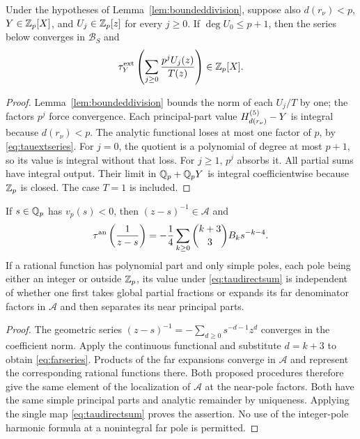 \begin{proposition}
\label{prop:integralextension}
Under the hypotheses of Lemma~\ref{lem:boundeddivision}, suppose also
$d(r_\nu)<p$, $Y\in\mathbb Z_p[X]$, and $U_j\in\mathbb Z_p[z]$ for every $j\ge0$.
If $\deg U_0\le p+1$, then the series below converges in $\mathcal B_S$ and
\begin{equation}\label{eq:integralextension}
 \tau^{\mathrm{ext}}_Y\left(\sum_{j\ge0}\frac{p^jU_j(z)}{T(z)}\right)\in\mathbb Z_p[X].
\end{equation}
\end{proposition}
\begin{proof}
Lemma~\ref{lem:boundeddivision} bounds the norm of each $U_j/T$ by one;
the factors $p^j$ force convergence. Each principal-part value
$H^{(5)}_{d(r_\nu)}-Y$ is integral because $d(r_\nu)<p$. The analytic
functional loses at most one factor of $p$, by
\eqref{eq:tauextseries}. For $j=0$, the quotient is a polynomial of degree
at most $p+1$, so its value is integral without that loss. For $j\ge1$,
$p^j$ absorbs it. All partial sums have integral output. Their limit in
$\mathbb Q_p+\mathbb Q_p Y$ is integral coefficientwise because $\mathbb Z_p$ is closed.
The case $T=1$ is included.
\end{proof}

\begin{lemma}
\label{lem:farpoles}
If $s\in\mathbb Q_p$ has $v_p(s)<0$, then $(z-s)^{-1}\in\mathcal A$ and
\begin{equation}\label{eq:farseries}
 \tau^{\mathrm{an}}\left(\frac1{z-s}\right)
  =-\frac14\sum_{k\ge0}\binom{k+3}{3}B_k s^{-k-4}.
\end{equation}
If a rational function has polynomial part and only simple poles, each
pole being either an integer or outside $\mathbb Z_p$, its value under
\eqref{eq:taudirectsum} is independent of whether one first takes global
partial fractions or expands its far denominator factors in
$\mathcal A$ and then separates its near principal parts.
\end{lemma}
\begin{proof}
The geometric series
$(z-s)^{-1}=-\sum_{d\ge0}s^{-d-1}z^d$ converges in the coefficient norm.
Apply the continuous functional and substitute $d=k+3$ to obtain
\eqref{eq:farseries}. Products of the far expansions converge in
$\mathcal A$ and represent the corresponding rational functions there.
Both proposed procedures therefore give the same element of the
localization of $\mathcal A$ at the near-pole factors. Both have the same
simple principal parts and analytic remainder by uniqueness. Applying the
single map \eqref{eq:taudirectsum} proves the assertion. No use of the
integer-pole harmonic formula at a nonintegral far pole is permitted.
\end{proof}

